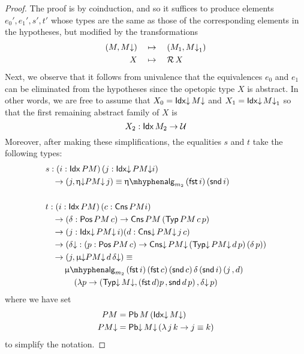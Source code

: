 \begin{proof}
  The proof is by coinduction, and so it suffices to produce elements
  $e_0', e_1', s', t'$ whose types are the same as those of the
  corresponding elements in the hypotheses, but modified by the
  transformations
  \begin{align*}
    (M , M{\downarrow}) &\quad \mapsto \quad (M_1 , M{\downarrow}_1) \\
    X &\quad \mapsto  \quad \mathcal{R}\, X
  \end{align*}
  Next, we observe that it follows from univalence that the
  equivalences $e_0$ and $e_1$ can be eliminated from the hypotheses
  since the opetopic type $X$ is abstract. In other words, we are free
  to assume that $X_0 = \mathsf{Idx}{\downarrow}\, M{\downarrow}$ and $X_1 = \mathsf{Idx}{\downarrow}\, M{\downarrow}_1$ so that
  the first remaining abstract family of $X$ is
  \[ X_2 : \mathsf{Idx}\, M_2 \to \mathcal{U} \] Moreover, after making these
  simplifications, the equalities $s$ and $t$ take the following
  types:
  \begin{align*}
    &s : (i : \Idx PM)\, (j : \Idxd PM\da i) \\
    &\hspace{.3cm} \to (j , \upetad PM\da\, j) \equiv \upeta\alg_{m_2}\, (\fst i)\, (\snd i) \\
    \\
    &t : (i : \Idx PM)\, (c : \Cns PM i) \\
    &\hspace{.3cm} \to (\delta : \Pos PM\, c) \to \Cns PM\, (\Typ PM\, c\, p) \\
    &\hspace{.3cm} \to (j : \Idxd PM\da\, i) (d : \Cnsd PM\da\, j\, c) \\
    &\hspace{.3cm} \to (\delta\da : (p : \Pos PM\, c) \to \Cnsd PM\da\, (\Typd PM\da\, d\, p)\, (\delta\, p)) \\
    &\hspace{.3cm} \to (j , \upmud PM\da\, d\, \delta\da) \equiv \\
    &\hspace{.8cm} \upmu\alg_{m_2}\, (\fst i)\, (\fst c)\, (\snd c)\, \delta\, (\snd i)\, (j \,, d)\, \\
    &\hspace{1.2cm} (\lambda p \to (\Typd M\da, (\fst d) p \,, \snd d\, p)\,, \delta\da\, p)
  \end{align*}
  where we have set
  \begin{align*}
    PM &= \mathsf{Pb}\, M\, (\mathsf{Idx}{\downarrow}\, M{\downarrow}) \\
    PM{\downarrow} &= \mathsf{Pb{\downarrow}}\, M{\downarrow}\, (\lambda\, j\, k \to j \equiv k)
  \end{align*}
  to simplify the notation.


\end{proof}
